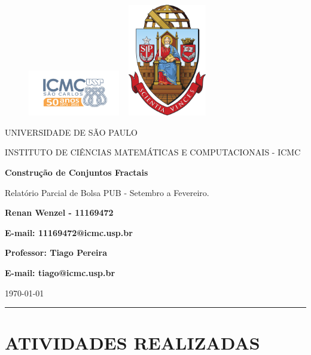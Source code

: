 \documentclass[12pt]{article}
\theoremstyle{definition}
\begin{document}
\begin{figure}[ht]
	\includegraphics[width=4cm]{../icmc.png}
	\hspace{7cm}
	\includegraphics[height=4.9cm,width=4cm]{../brasao_usp_cor.jpg}
	\endminipage
\end{figure}

\begin{center}
	\vspace{1cm}
	\LARGE
	UNIVERSIDADE DE SÃO PAULO

	\vspace{1.3cm}
	\LARGE
	INSTITUTO DE CIÊNCIAS MATEMÁTICAS E COMPUTACIONAIS - ICMC

	\vspace{1.7cm}
	\Large
	\textbf{Construção de Conjuntos Fractais}

	Relatório Parcial de Bolsa PUB - Setembro a Fevereiro.

	\vspace{1.3cm}
	\large
	\textbf{Renan Wenzel - 11169472}

	\textbf{E-mail: 11169472@icmc.usp.br}

	\vspace{1.3cm}
	\large
	\textbf{Professor: Tiago Pereira}

	\textbf{E-mail: tiago@icmc.usp.br}

	\vspace{1.3cm}
	\today
\end{center}

\hrule
\vspace{1.3cm}

\section*{ATIVIDADES REALIZADAS}
\end{document}
